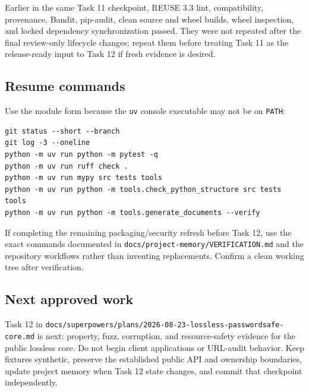\documentclass[
  letterpaper,
]{article}
\newcommand{\passthrough}[1]{#1}
\begin{document}
Earlier in the same Task 11 checkpoint, REUSE 3.3 lint, compatibility, provenance, Bandit, pip-audit, clean source and
wheel builds, wheel inspection, and locked dependency synchronization passed. They were not repeated after the final
review-only lifecycle changes; repeat them before treating Task 11 as the release-ready input to Task 12 if fresh
evidence is desired.

\subsection{Resume commands}\label{resume-commands}

Use the module form because the \passthrough{\lstinline!uv!} console executable may not be on
\passthrough{\lstinline!PATH!}:

\begin{lstlisting}
git status --short --branch
git log -3 --oneline
python -m uv run python -m pytest -q
python -m uv run ruff check .
python -m uv run mypy src tests tools
python -m uv run python -m tools.check_python_structure src tests tools
python -m uv run python -m tools.generate_documents --verify
\end{lstlisting}

If completing the remaining packaging/security refresh before Task 12, use the exact commands documented in
\nolinkurl{docs/project-memory/VERIFICATION.md} and the repository workflows rather than inventing replacements. Confirm
a clean working tree after verification.

\subsection{Next approved work}\label{next-approved-work}

Task 12 in \nolinkurl{docs/superpowers/plans/2026-08-23-lossless-passwordsafe-core.md} is next: property, fuzz,
corruption, and resource-safety evidence for the public lossless core. Do not begin client applications or URL-audit
behavior. Keep fixtures synthetic, preserve the established public API and ownership boundaries, update project memory
when Task 12 state changes, and commit that checkpoint independently.
\end{document}
